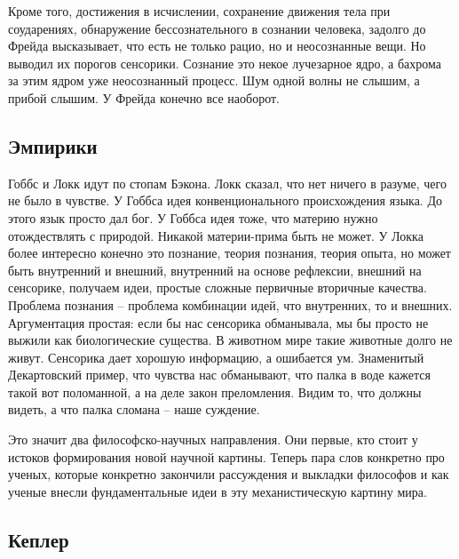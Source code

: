 \documentclass[a4paper, 12pt]{article}
\begin{document}
Кроме того, достижения в исчислении, сохранение движения тела при 
соударениях, обнаружение бессознательного в сознании человека, задолго 
до Фрейда высказывает, что есть не только рацио, но и неосознанные вещи. 
Но выводил их порогов сенсорики. Сознание это некое лучезарное ядро, 
а бахрома за этим ядром уже неосознанный процесс. Шум одной волны не 
слышим, а прибой слышим. У Фрейда конечно все наоборот.


\subsection{Эмпирики}

Гоббс и Локк идут по стопам Бэкона. Локк сказал, что нет ничего 
в разуме, чего не было в чувстве. У Гоббса идея конвенционального 
происхождения языка. До этого язык просто дал бог. У Гоббса идея тоже, 
что материю нужно отождествлять с природой. Никакой материи-прима быть 
не может. У Локка более интересно конечно это познание, теория познания, 
теория опыта, но может быть внутренний и внешний, внутренний на основе 
рефлексии, внешний на сенсорике, получаем идеи, простые сложные 
первичные вторичные качества. Проблема познания -- проблема комбинации 
идей, что внутренних, то и внешних. Аргументация простая: если бы нас 
сенсорика обманывала, мы бы просто не выжили как биологические существа. 
В животном мире такие животные долго не живут. Сенсорика дает хорошую 
информацию, а ошибается ум. Знаменитый Декартовский пример, что чувства 
нас обманывают, что палка в воде кажется такой вот поломанной, а на деле 
закон преломления. Видим то, что должны видеть, а что палка сломана -- 
наше суждение.

Это значит два философско-научных направления. Они первые, кто стоит 
у истоков формирования новой научной картины. Теперь пара слов конкретно 
про ученых, которые конкретно закончили рассуждения и выкладки философов 
и как ученые внесли фундаментальные идеи в эту механистическую картину 
мира.


\subsection{Кеплер}
\end{document}
